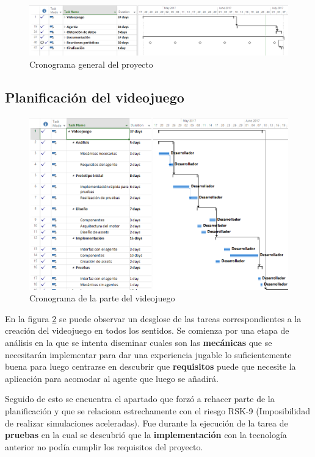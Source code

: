 \begin{figure}
	\centerline{\includegraphics[width=19cm]{otros/capturasPlanificacion/general.PNG}}
	\caption{Cronograma general del proyecto}
	\label{plan:general}
\end{figure}

\subsection{Planificación del videojuego}

\begin{figure}
	\centerline{\includegraphics[width=19cm]{otros/capturasPlanificacion/videojuego.PNG}}
	\caption{Cronograma de la parte del videojuego}
	\label{plan:videojuego}
\end{figure}

En la figura \ref{plan:videojuego} se puede observar un desglose de las tareas correspondientes a la creación del videojuego en todos los sentidos. Se comienza por una etapa de análisis en la que se intenta diseminar cuales son las \textbf{mecánicas} que se necesitarán implementar para dar una experiencia jugable lo suficientemente buena para luego centrarse en descubrir que \textbf{requisitos} puede que necesite la aplicación para acomodar al agente que luego se añadirá.

\bigskip

Seguido de esto se encuentra el apartado que forzó a rehacer parte de la planificación y que se relaciona estrechamente con el riesgo RSK-9 (Imposibilidad de realizar simulaciones aceleradas). Fue durante la ejecución de la tarea de \textbf{pruebas} en la cual se descubrió que la \textbf{implementación} con la tecnología anterior no podía cumplir los requisitos del proyecto.

